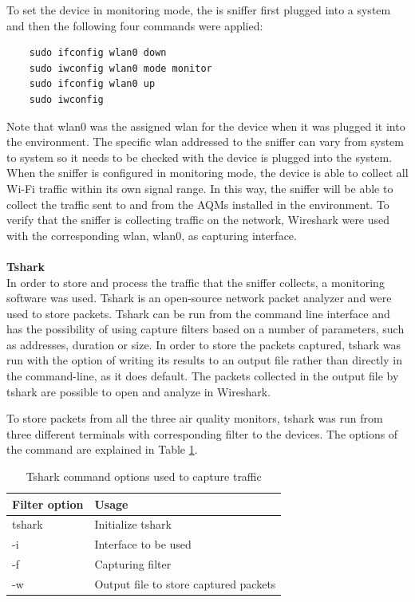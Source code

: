 To set the device in monitoring mode, the is sniffer first plugged into a system and then the following four commands were applied:

\begin{verbatim}
    sudo ifconfig wlan0 down
    sudo iwconfig wlan0 mode monitor
    sudo ifconfig wlan0 up
    sudo iwconfig
\end{verbatim}

Note that wlan0 was the assigned wlan for the device when it was plugged it into the environment. The specific wlan addressed to the sniffer can vary from system to system so it needs to be checked with the device is plugged into the system. When the sniffer is configured in monitoring mode, the device is able to collect all \gls{Wi-Fi} traffic within its own signal range. In this way, the sniffer will be able to collect the traffic sent to and from the \gls{AQM}s installed in the environment. To verify that the sniffer is collecting traffic on the network, Wireshark were used with the corresponding wlan, wlan0, as capturing interface. 
\\\\
\textbf{Tshark}\\
In order to store and process the traffic that the sniffer collects, a monitoring software was used. Tshark \cite{Tshark} is an open-source network packet analyzer and were used to store packets. Tshark can be run from the command line interface and has the possibility of using capture filters based on a number of parameters, such as addresses, duration or size. In order to store the packets captured, tshark was run with the option of writing its results to an output file rather than directly in the command-line, as it does default. The packets collected in the output file by tshark are possible to open and analyze in Wireshark. 

To store packets from all the three air quality monitors, tshark was run from three different terminals with corresponding filter to the devices. The options of the command are explained in Table \ref{tab:tshark}.

\begin{table}[H]
    \centering
    \caption{Tshark command options used to capture traffic}
    \begin{tabular}{|l|l|}
    \hline
    \textbf{Filter option} & \textbf{Usage}                        \\ \hline
    tshark                 & Initialize tshark                     \\ \hline
    -i                     & Interface to be used                  \\ \hline
    -f                     & Capturing filter                      \\ \hline
    -w                     & Output file to store captured packets \\ \hline
    \end{tabular}
    \label{tab:tshark}
\end{table}

